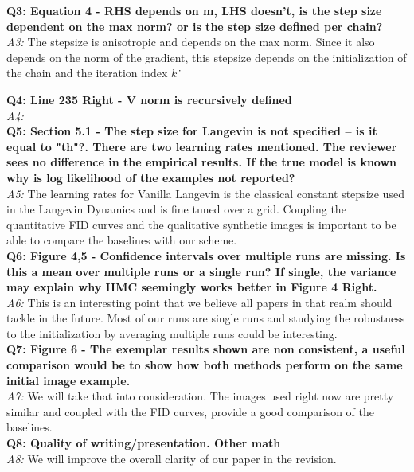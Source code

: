 \documentclass{article}
\begin{document}
\textbf{Q3: Equation 4 - RHS depends on m, LHS doesn't, is the step size dependent on the max norm? or is the step size defined per chain?}\\
\textit{A3: }The stepsize is anisotropic and depends on the max norm. Since it also depends on the norm of the gradient, this stepsize depends on the initialization of the chain and the iteration index $k$\.\

\textbf{Q4: Line 235 Right - V norm is recursively defined}\\
\textit{A4: }\\

\textbf{Q5: Section 5.1 - The step size for Langevin is not specified -- is it equal to "th"?. There are two learning rates mentioned. The reviewer sees no difference in the empirical results. If the true model is known why is log likelihood of the examples not reported?}\\
\textit{A5: } The learning rates for Vanilla Langevin is the classical constant stepsize used in the Langevin Dynamics and is fine tuned over a grid. 
Coupling the quantitative FID curves and the qualitative synthetic images is important to be able to compare the baselines with our scheme.\\

\textbf{Q6: Figure 4,5 - Confidence intervals over multiple runs are missing. Is this a mean over multiple runs or a single run? If single, the variance may explain why HMC seemingly works better in Figure 4 Right.}\\
\textit{A6: } This is an interesting point that we believe all papers in that realm should tackle in the future. Most of our runs are single runs and studying the robustness to the initialization by averaging multiple runs could be interesting.\\

\textbf{Q7: Figure 6 - The exemplar results shown are non consistent, a useful comparison would be to show how both methods perform on the same initial image example.}\\
\textit{A7: }We will take that into consideration. The images used right now are pretty similar and coupled with the FID curves, provide a good comparison of the baselines.\\


\textbf{Q8: Quality of writing/presentation. Other math}\\
\textit{A8: }We will improve the overall clarity of our paper in the revision.\\
\end{document}
